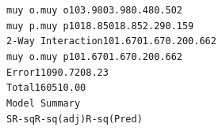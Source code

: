 \documentclass[12pt,a4paper]{article}
\newcommand{\code}[1]{\texttt{#1}}
\begin{document}
\hspace*{1cm}\code{muy o.muy o}\hspace*{1cm}\code{1}\hspace*{1.25cm}\code{03.98}\hspace*{1.25cm}\code{03.98}\hspace*{1.75cm}\code{0.48}\hspace*{1.4cm}\code{0.502}\\
\hspace*{1cm}\code{muy p.muy p}\hspace*{1cm}\code{1}\hspace*{1cm}\code{018.85}\hspace*{1cm}\code{018.85}\hspace*{1.75cm}\code{2.29}\hspace*{1.4cm}\code{0.159}\\
\hspace*{0.5cm}\code{2-Way Interaction}\hspace*{0.05cm}\code{1}\hspace*{1.25cm}\code{01.67}\hspace*{1.25cm}\code{01.67}\hspace*{1.75cm}\code{0.20}\hspace*{1.4cm}\code{0.662}\\
\hspace*{1cm}\code{muy o.muy p}\hspace*{1.01cm}\code{1}\hspace*{1.25cm}\code{01.67}\hspace*{1.25cm}\code{01.67}\hspace*{1.75cm}\code{0.20}\hspace*{1.4cm}\code{0.662}\\
\code{Error}\hspace*{3.25cm}\code{11}\hspace*{1cm}\code{090.72}\hspace*{1.25cm}\code{08.23}\\
\code{Total}\hspace*{3.26cm}\code{16}\hspace*{0.755cm}\code{0510.00}\\
\newline
\code{Model Summary}\\
\hspace*{2cm}\code{S}\hspace*{1.5cm}\code{R-sq}\hspace*{1.5cm}\code{R-sq(adj)}\hspace*{1.5cm}\code{R-sq(Pred)}\\
\end{document}
